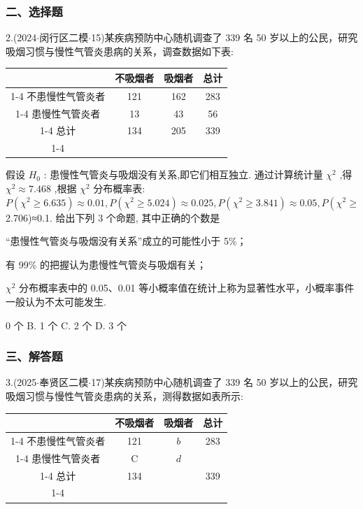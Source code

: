 \subsubsection*{二、选择题}

2.(2024$\cdot$闵行区二模$\cdot$15)某疾病预防中心随机调查了 339 名 50 岁以上的公民，研究吸烟习惯与慢性气管炎患病的关系，调查数据如下表:

\begin{center}

\begin{tabular}{|c|c|c|c|}
\hline
\phantom{X} & 不吸烟者 & 吸烟者 & 总计 \\
\cline{1-4}
不患慢性气管炎者 & 121 & 162 & 283 \\
\cline{1-4}
患慢性气管炎者 & 13 & 43 & 56 \\
\cline{1-4}
总计 & 134 & 205 & 339 \\
\cline{1-4}
\hline
\end{tabular}
\end{center}

假设 ${H}_{0}$ : 患慢性气管炎与吸烟没有关系,即它们相互独立. 通过计算统计量 ${\chi }^{2}$ ,得 ${\chi }^{2} \approx  {7.468}$ ,根据 ${\chi }^{2}$ 分布概率表: $P\left( {{\chi }^{2} \geq  {6.635}}\right)  \approx  {0.01},P\left( {{\chi }^{2} \geq  {5.024}}\right)  \approx  {0.025},P\left( {{\chi }^{2} \geq  {3.841}}\right)  \approx  {0.05},P\left( {{\chi }^{2} \geq  }\right.$ 2.706)≈0.1. 给出下列 3 个命题, 其中正确的个数是 \dotfill{(\kh{})}

   “患慢性气管炎与吸烟没有关系”成立的可能性小于 5\%；

   有 99\% 的把握认为患慢性气管炎与吸烟有关；

   ${\chi }^{2}$ 分布概率表中的 0.05、0.01 等小概率值在统计上称为显著性水平，小概率事件一般认为不太可能发生.

\xx{}{}{}{}0 个 B. 1 个 C. 2 个 D. 3 个

\subsubsection*{三、解答题}

3.(2025$\cdot$奉贤区二模$\cdot$17)某疾病预防中心随机调查了 339 名 50 岁以上的公民，研究吸烟习惯与慢性气管炎患病的关系，测得数据如表所示:

\begin{center}

\begin{tabular}{|c|c|c|c|}
\hline
\phantom{X} & 不吸烟者 & 吸烟者 & 总计 \\
\cline{1-4}
不患慢性气管炎者 & 121 & $b$ & 283 \\
\cline{1-4}
患慢性气管炎者 & C & $d$ & \phantom{X} \\
\cline{1-4}
总计 & 134 & \phantom{X} & 339 \\
\cline{1-4}
\hline
\end{tabular}
\end{center}

